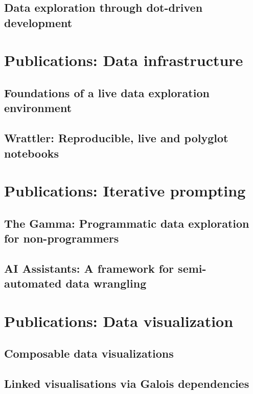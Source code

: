 \documentclass[fleqn,11pt]{report}
\theoremstyle{definition}
\begin{document}
\chapter{Data exploration through dot-driven development}
\label{ch:dotdriven}

\part{Publications: Data infrastructure}
\label{part:infra}

\chapter{Foundations of a live data exploration environment}
\label{ch:foundations}

\chapter{Wrattler: Reproducible, live and polyglot notebooks}
\label{ch:wrattler}

\part{Publications: Iterative prompting}
\label{part:iterative}

\chapter{The Gamma: Programmatic data exploration for non-programmers}
\label{ch:thegamma}

\chapter{AI Assistants: A framework for semi-automated data wrangling}
\label{ch:aia}

\part{Publications: Data visualization}
\label{part:visualization}

\chapter{Composable data visualizations}
\label{ch:compost}

\chapter{Linked visualisations via Galois dependencies}
\label{ch:galois}
\end{document}

